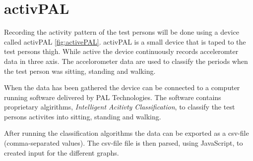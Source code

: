 \section{activPAL}
Recording the activity pattern of the test persons will be done using a device called activPAL \ref{fig:activePAL}. activPAL is a small device that is taped to the test persons thigh. While active the device continuously records acceleromter data in three axis. The accelorometer data are used to classify the periods when the test person was sitting, standing and walking.

When the data has been gathered the device can be connected to a computer running software delivered by PAL Technologies. The software contains proprietary algirithms, \emph{Intelligent Acitivty Classification}, to classify the test persons activites into sitting, standing and walking.


After running the classification algorithms the data can be exported as a csv-file (comma-separated values). The csv-file file is then parsed, using JavaScript, to created input for the different graphs.
